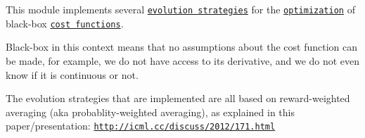 This module implements several \href{http://en.wikipedia.org/wiki/Evolution_strategy}{\tt evolution strategies} for the \href{http://en.wikipedia.org/wiki/Optimization_%28mathematics%29}{\tt optimization} of black-\/box \href{http://en.wikipedia.org/wiki/Loss_function}{\tt cost functions}.

Black-\/box in this context means that no assumptions about the cost function can be made, for example, we do not have access to its derivative, and we do not even know if it is continuous or not.

The evolution strategies that are implemented are all based on reward-\/weighted averaging (aka probablity-\/weighted averaging), as explained in this paper/presentation\+: \href{http://icml.cc/discuss/2012/171.html}{\tt http\+://icml.\+cc/discuss/2012/171.\+html}

